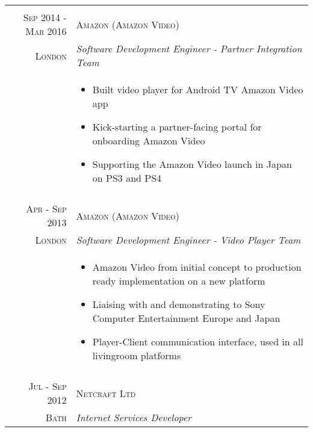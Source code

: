 \begin{tabular}{r|p{11cm}}
\multicolumn{2}{c}{} \\

\textsc{Sep 2014 - Mar 2016} & \textsc{Amazon (Amazon Video)}\\
\textsc{London} & \emph{Software Development Engineer - Partner Integration Team}\\
& \begin{footnotesize}
\begin{itemize}
	\vspace*{-\baselineskip}
	\item Built video player for Android TV Amazon Video app
	\item Kick-starting a partner-facing portal for onboarding Amazon Video
	\item Supporting the Amazon Video launch in Japan on PS3 and PS4
	\vspace*{-\baselineskip}
\end{itemize}
\end{footnotesize}\\

\multicolumn{2}{c}{} \\

\textsc{Apr - Sep 2013} & \textsc{Amazon (Amazon Video)}\\
\textsc{London} & \emph{Software Development Engineer - Video Player Team}\\
& \begin{footnotesize}
\begin{itemize}
	\vspace*{-\baselineskip}
	\item Amazon Video from initial concept to production ready implementation on a new platform
	\item Liaising with and demonstrating to Sony Computer Entertainment Europe and Japan
	\item Player-Client communication interface, used in all livingroom platforms
	\vspace*{-\baselineskip}
\end{itemize}
\end{footnotesize}\\

\multicolumn{2}{c}{} \\


\textsc{Jul - Sep 2012} & \textsc{Netcraft Ltd}\\ 
\textsc{Bath} & \emph{Internet Services Developer}\\


\end{tabular}
